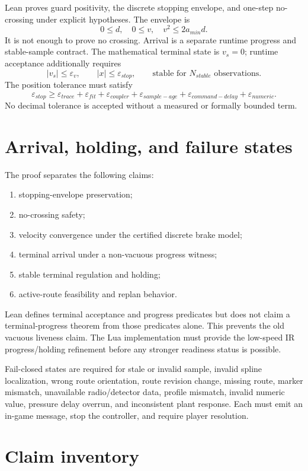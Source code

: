 \documentclass[10pt,a4paper]{article}
\begin{document}
Lean proves guard positivity, the discrete stopping envelope, and one-step
no-crossing under explicit hypotheses.  The envelope is
\[
 0\leq d,\quad 0\leq v,\quad v^2\leq 2a_{min}d.
\]
It is not enough to prove no crossing.  Arrival is a separate runtime progress
and stable-sample contract.  The mathematical terminal state is $v_s=0$;
runtime acceptance additionally requires
\[
 |v_s|\leq\varepsilon_v,
 \qquad |x|\leq\varepsilon_{stop},
 \qquad \text{stable for }N_{stable}\text{ observations}.
\]
The position tolerance must satisfy
\[
 \varepsilon_{stop}\geq
 \varepsilon_{trace}+\varepsilon_{fit}+\varepsilon_{coupler}
 +\varepsilon_{sample-age}+\varepsilon_{command-delay}
 +\varepsilon_{numeric}.
\]
No decimal tolerance is accepted without a measured or formally bounded term.

\section{Arrival, holding, and failure states}

The proof separates the following claims:
\begin{enumerate}
  \item stopping-envelope preservation;
  \item no-crossing safety;
  \item velocity convergence under the certified discrete brake model;
  \item terminal arrival under a non-vacuous progress witness;
  \item stable terminal regulation and holding;
  \item active-route feasibility and replan behavior.
\end{enumerate}
Lean defines terminal acceptance and progress predicates but does not claim a
terminal-progress theorem from those predicates alone.  This prevents the old
vacuous liveness claim.  The Lua implementation must provide the low-speed IR
progress/holding refinement before any stronger readiness status is possible.

Fail-closed states are required for stale or invalid sample, invalid spline
localization, wrong route orientation, route revision change, missing route,
marker mismatch, unavailable radio/detector data, profile mismatch, invalid
numeric value, pressure delay overrun, and inconsistent plant response.  Each
must emit an in-game message, stop the controller, and require player
resolution.

\section{Claim inventory}
\end{document}
